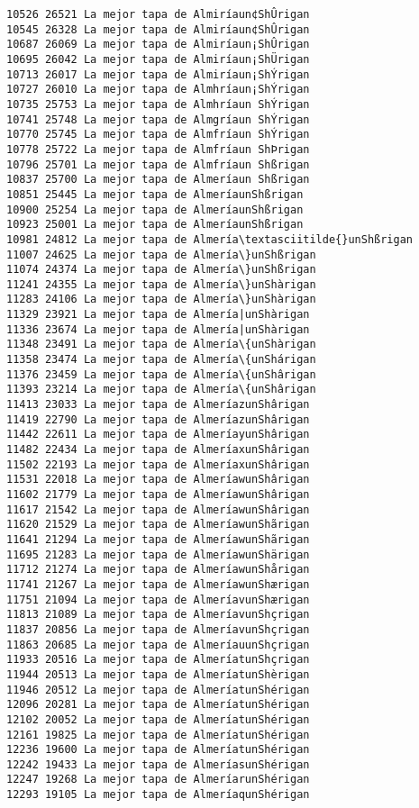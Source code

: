 \documentclass[11pt]{article}
\begin{document}
\begin{Verbatim}[commandchars=\\\{\}]
10526 26521 La mejor tapa de Almiríaun¢ShÛrigan
10545 26328 La mejor tapa de Almiríaun¢ShÛrigan
10687 26069 La mejor tapa de Almiríaun¡ShÛrigan
10695 26042 La mejor tapa de Almiríaun¡ShÜrigan
10713 26017 La mejor tapa de Almiríaun¡ShÝrigan
10727 26010 La mejor tapa de Almhríaun¡ShÝrigan
10735 25753 La mejor tapa de Almhríaun ShÝrigan
10741 25748 La mejor tapa de Almgríaun ShÝrigan
10770 25745 La mejor tapa de Almfríaun ShÝrigan
10778 25722 La mejor tapa de Almfríaun ShÞrigan
10796 25701 La mejor tapa de Almfríaun Shßrigan
10837 25700 La mejor tapa de Almeríaun Shßrigan
10851 25445 La mejor tapa de AlmeríaunShßrigan
10900 25254 La mejor tapa de AlmeríaunShßrigan
10923 25001 La mejor tapa de AlmeríaunShßrigan
10981 24812 La mejor tapa de Almería\textasciitilde{}unShßrigan
11007 24625 La mejor tapa de Almería\}unShßrigan
11074 24374 La mejor tapa de Almería\}unShßrigan
11241 24355 La mejor tapa de Almería\}unShàrigan
11283 24106 La mejor tapa de Almería\}unShàrigan
11329 23921 La mejor tapa de Almería|unShàrigan
11336 23674 La mejor tapa de Almería|unShàrigan
11348 23491 La mejor tapa de Almería\{unShàrigan
11358 23474 La mejor tapa de Almería\{unShárigan
11376 23459 La mejor tapa de Almería\{unShârigan
11393 23214 La mejor tapa de Almería\{unShârigan
11413 23033 La mejor tapa de AlmeríazunShârigan
11419 22790 La mejor tapa de AlmeríazunShârigan
11442 22611 La mejor tapa de AlmeríayunShârigan
11482 22434 La mejor tapa de AlmeríaxunShârigan
11502 22193 La mejor tapa de AlmeríaxunShârigan
11531 22018 La mejor tapa de AlmeríawunShârigan
11602 21779 La mejor tapa de AlmeríawunShârigan
11617 21542 La mejor tapa de AlmeríawunShârigan
11620 21529 La mejor tapa de AlmeríawunShãrigan
11641 21294 La mejor tapa de AlmeríawunShãrigan
11695 21283 La mejor tapa de AlmeríawunShärigan
11712 21274 La mejor tapa de AlmeríawunShårigan
11741 21267 La mejor tapa de AlmeríawunShærigan
11751 21094 La mejor tapa de AlmeríavunShærigan
11813 21089 La mejor tapa de AlmeríavunShçrigan
11837 20856 La mejor tapa de AlmeríavunShçrigan
11863 20685 La mejor tapa de AlmeríauunShçrigan
11933 20516 La mejor tapa de AlmeríatunShçrigan
11944 20513 La mejor tapa de AlmeríatunShèrigan
11946 20512 La mejor tapa de AlmeríatunShérigan
12096 20281 La mejor tapa de AlmeríatunShérigan
12102 20052 La mejor tapa de AlmeríatunShérigan
12161 19825 La mejor tapa de AlmeríatunShérigan
12236 19600 La mejor tapa de AlmeríatunShérigan
12242 19433 La mejor tapa de AlmeríasunShérigan
12247 19268 La mejor tapa de AlmeríarunShérigan
12293 19105 La mejor tapa de AlmeríaqunShérigan

\end{Verbatim}
\end{document}
